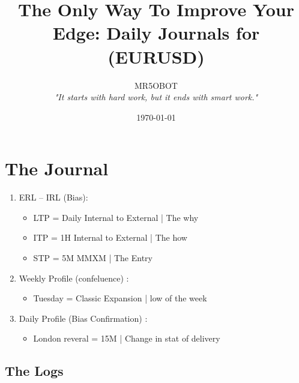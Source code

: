 \documentclass{article}
\title{The Only Way To Improve Your Edge: Daily Journals for (EURUSD)}
\author{MR5OBOT \\ \textit{"It starts with hard work, but it ends with smart work."}}
\date{\today}
\begin{document}
\maketitle
\pagestyle{fancy}
\tableofcontents

\vspace{0.5cm}

\noindent\hdashrule[0.1ex]{\linewidth}{0.1pt}{2mm} 
\section{The Journal} 
\begin{enumerate}
  \item ERL -- IRL (Bias): 
\begin{itemize} 
  \item LTP = \hspace{0.3pt} Daily Internal to External | The why
  \item ITP = \hspace{0.3pt} 1H Internal to External | The how 
  \item STP = \hspace{0.3pt} 5M MMXM | The Entry 
\end{itemize}

    \item Weekly Profile (confeluence)  : 

\begin{itemize} 
  \item Tuesday = \hspace{0.3pt} Classic Expansion | low of the week
\end{itemize}

    \item Daily Profile (Bias Confirmation)  : 
\begin{itemize} 
  \item London reveral = \hspace{0.3pt} 15M | Change in stat of delivery
\end{itemize}

\end{enumerate}

\subsection{The Logs}

\renewcommand{\arraystretch}{1.5} %
\setlength{\tabcolsep}{10pt} %
\end{document}
